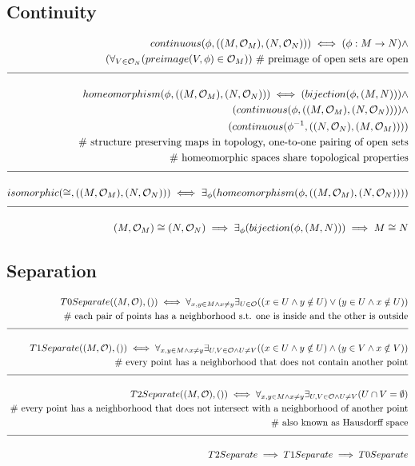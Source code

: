\documentclass[a4paper]{article}
\newcommand{\eqComment}[1]{\text{  \# #1}}
\newcommand{\n}{\\[1.5ex] \hline \nonumber \\[0ex]}
\newcommand{\m}{\nonumber \\}
\begin{document}
\subsection{Continuity}
\begin{tcolorbox}
\begin{align}
    continuous(\phi, ((M, \mathcal{O}_M), (N, \mathcal{O}_N))) \iff (\phi: M \to N) \land
\m (\forall_{V \in \mathcal{O}_N} (preimage(V, \phi) \in \mathcal{O}_M)) \eqComment{preimage of open sets are open}
\n homeomorphism(\phi, ((M, \mathcal{O}_M), (N, \mathcal{O}_N))) \iff (bijection(\phi, (M, N))) \land
\m (continuous(\phi, ((M, \mathcal{O}_M), (N, \mathcal{O}_N)))) \land
\m (continuous(\phi^{-1}, ((N, \mathcal{O}_N), (M, \mathcal{O}_M))))
\m \eqComment{structure preserving maps in topology, one-to-one pairing of open sets}
\m \eqComment{homeomorphic spaces share topological properties}
\n isomorphic(\cong, ((M, \mathcal{O}_M), (N, \mathcal{O}_N))) \iff \exists_\phi (homeomorphism(\phi, ((M, \mathcal{O}_M), (N, \mathcal{O}_N))))
\n (M, \mathcal{O}_M) \cong (N, \mathcal{O}_N) \implies \exists_\phi(bijection(\phi, (M, N))) \implies M \cong N
\end {align}
\end{tcolorbox}

\subsection{Separation}
\begin{tcolorbox}
\begin{align}
   T0Separate((M, \mathcal{O}), ()) \iff \forall_{x, y \in M \land x \neq y} \exists_{U \in \mathcal{O}} ((x \in U \land y \notin U) \lor (y \in U \land x \notin U))
\m \eqComment{each pair of points has a neighborhood s.t. one is inside and the other is outside}
\n T1Separate((M, \mathcal{O}), ()) \iff \forall_{x, y \in M \land x \neq y} \exists_{U, V \in \mathcal{O} \land U \neq V} ((x \in U \land y \notin U) \land (y \in V \land x \notin V))
\m \eqComment{every point has a neighborhood that does not contain another point}
\n T2Separate((M, \mathcal{O}), ()) \iff \forall_{x, y \in M \land x \neq y} \exists_{U, V \in \mathcal{O} \land U \neq V} (U \cap V = \emptyset)
\m \eqComment{every point has a neighborhood that does not intersect with a neighborhood of another point}
\m \eqComment{also known as Hausdorff space}
\n T2Separate \implies T1Separate \implies T0Separate
\end {align}
\end{tcolorbox}
\end{document}

